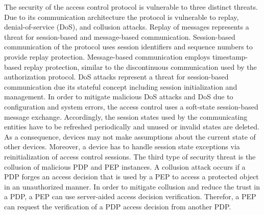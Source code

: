 The security of the access control protocol is vulnerable to three distinct threats.
Due to its communication architecture the protocol is vulnerable to replay, denial-of-service (DoS), and collusion attacks.
Replay of messages represents a threat for session-based and message-based communication.
Session-based communication of the protocol uses session identifiers and sequence numbers to provide replay protection.
Message-based communication employs timestamp-based replay protection, similar to the discontinuous communication used by the authorization protocol.
DoS attacks represent a threat for session-based communication due its stateful concept including session initialization and management.
In order to mitigate malicious DoS attacks and DoS due to configuration and system errors, the access control uses a soft-state session-based message exchange.
Accordingly, the session states used by the communicating entities have to be refreshed periodically and unused or invalid states are deleted.
As a consequence, devices may not make assumptions about the current state of other devices.
Moreover, a device has to handle session state exceptions via reinitialization of access control sessions.
The third type of security threat is the collusion of malicious PDP and PEP instances.
A collusion attack occurs if a PDP forges an access decision that is used by a PEP to access a protected object in an unauthorized manner.
In order to mitigate collusion and reduce the trust in a PDP, a PEP can use server-aided access decision verification.
Therefor, a PEP can request the verification of a PDP access decision from another PDP.

